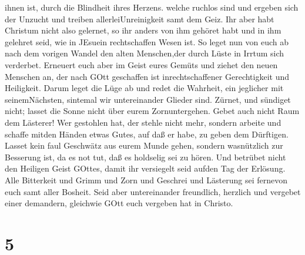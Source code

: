 ihnen ist, durch die Blindheit ihres Herzens.  welche
ruchlos sind und ergeben sich der Unzucht und treiben
allerleiUnreinigkeit samt dem Geiz.  Ihr aber habt Christum
nicht also gelernet,  so ihr anders von ihm gehöret habt
und in ihm gelehret seid, wie in JEsuein rechtschaffen Wesen ist.
 So leget nun von euch ab nach dem vorigen Wandel den alten
Menschen,der durch Lüste in Irrtum sich verderbet. 
Erneuert euch aber im Geist eures Gemüts  und ziehet den
neuen Menschen an, der nach GOtt geschaffen ist inrechtschaffener
Gerechtigkeit und Heiligkeit.  Darum leget die Lüge ab und
redet die Wahrheit, ein jeglicher mit seinemNächsten, sintemal wir
untereinander Glieder sind.  Zürnet, und sündiget nicht;
lasset die Sonne nicht über eurem Zornuntergehen.  Gebet
auch nicht Raum dem Lästerer!  Wer gestohlen hat, der
stehle nicht mehr, sondern arbeite und schaffe mitden Händen etwas
Gutes, auf daß er habe, zu geben dem Dürftigen.  Lasset
kein faul Geschwätz aus eurem Munde gehen, sondern wasnützlich zur
Besserung ist, da es not tut, daß es holdselig sei zu hören.
 Und betrübet nicht den Heiligen Geist GOttes, damit ihr
versiegelt seid aufden Tag der Erlösung.  Alle Bitterkeit
und Grimm und Zorn und Geschrei und Lästerung sei fernevon euch samt
aller Bosheit.  Seid aber untereinander freundlich,
herzlich und vergebet einer demandern, gleichwie GOtt euch vergeben hat
in Christo.

\hypertarget{section-4}{%
\section{5}\label{section-4}}


